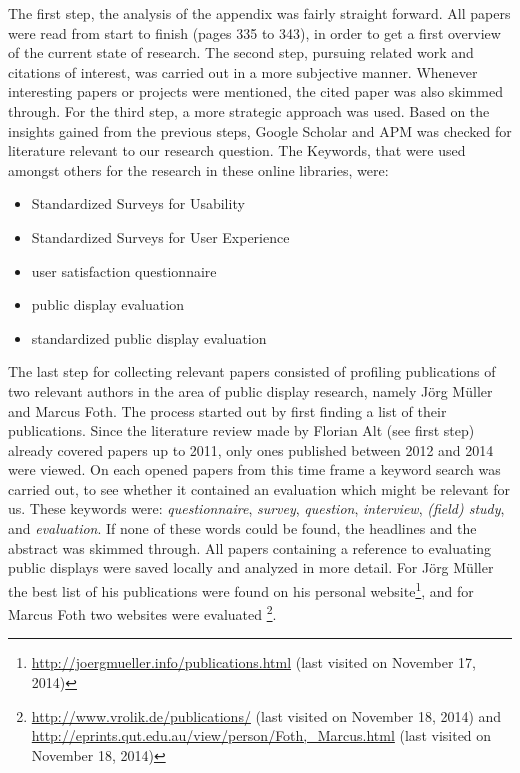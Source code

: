 	The first step, the analysis of the appendix was fairly straight forward. All papers were read from start to finish (pages 335 to 343), in order to get a first overview of the current state of research. 
	The second step, pursuing related work and citations of interest, was carried out in a more subjective manner. Whenever interesting papers or projects were mentioned, the cited paper was also skimmed through. 
	For the third step, a more strategic approach was used. Based on the insights gained from the previous steps, Google Scholar and APM was checked for literature relevant to our research question. The Keywords, that were used amongst others for the research in these online libraries, were:
	\begin{itemize}[itemsep=0pt] 
	\item Standardized Surveys for Usability
	\item Standardized Surveys for User Experience
	\item user satisfaction questionnaire
	\item public display evaluation
	\item standardized public display evaluation
	\end{itemize}

	The last step for collecting relevant papers consisted of profiling publications of two relevant authors in the area of public display research, namely J\"org M\"uller and Marcus Foth. The process started out by first finding a list of their publications. Since the literature review made by Florian Alt (see first step) already covered papers up to 2011, only ones published between 2012 and 2014 were viewed. 
	On each opened papers from this time frame a keyword search was carried out, to see whether it contained an evaluation which might be relevant for us. These keywords were: \textit{questionnaire}, \textit{survey}, \textit{question}, \textit{interview}, \textit{(field) study}, and \textit{evaluation}. If none of these words could be found, the headlines and the abstract was skimmed through. All papers containing a reference to evaluating public displays were saved locally and analyzed in more detail.
	For J\"org M\"uller the best list of his publications were found on his personal website\footnote{\url{http://joergmueller.info/publications.html} (last visited on November 17, 2014)}, and for Marcus Foth two websites were evaluated \footnote{\url{http://www.vrolik.de/publications/} (last visited on November 18, 2014) and \url{http://eprints.qut.edu.au/view/person/Foth,_Marcus.html} (last visited on November 18, 2014)}. 

